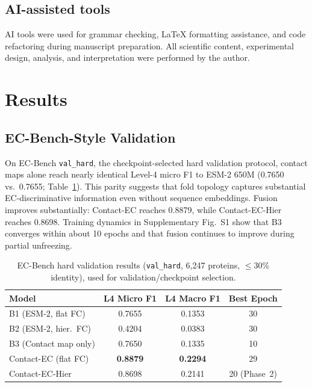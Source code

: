 \documentclass[numbered,contemporary,mediumone]{oup-authoring-template}
\begin{document}
\subsection{AI-assisted tools}

AI tools were used for grammar checking, LaTeX formatting assistance, and code
refactoring during manuscript preparation. All scientific content, experimental
design, analysis, and interpretation were performed by the author.

\section{Results}

\subsection{EC-Bench-Style Validation}

On EC-Bench \texttt{val\_hard}, the checkpoint-selected hard validation protocol,
contact maps alone reach nearly identical Level-4
micro F1 to ESM-2 650M (0.7650 vs.\ 0.7655; Table~\ref{tab:ecbench}). This parity
suggests that fold topology captures substantial EC-discriminative information
even without sequence embeddings. Fusion improves substantially: Contact-EC reaches
0.8879, while Contact-EC-Hier reaches 0.8698. Training dynamics in Supplementary
Fig.~S1 show that B3 converges within about 10 epochs and that fusion continues to
improve during partial unfreezing.

\begin{table}[!htbp]
\centering
\caption{EC-Bench hard validation results (\texttt{val\_hard}, 6{,}247 proteins,
$\leq$30\% identity), used for validation/checkpoint selection.}
\label{tab:ecbench}
\setlength{\tabcolsep}{5pt}
\begin{tabular}{lccc}
\toprule
Model & L4 Micro F1 & L4 Macro F1 & Best Epoch \\
\midrule
B1 (ESM-2, flat FC)       & 0.7655 & 0.1353 & 30 \\
B2 (ESM-2, hier.\ FC)     & 0.4204 & 0.0383 & 30 \\
B3 (Contact map only)     & 0.7650 & 0.1335 & 10 \\
Contact-EC (flat FC)      & \textbf{0.8879} & \textbf{0.2294} & 29 \\
Contact-EC-Hier           & 0.8698 & 0.2141 & 20 (Phase~2) \\
\bottomrule
\end{tabular}
\end{table}
\end{document}

